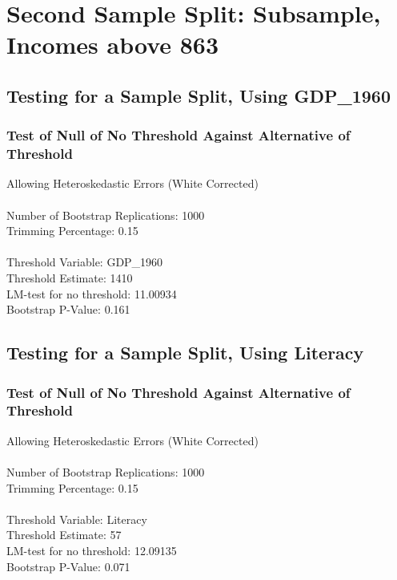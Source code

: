 \section{Second Sample Split: Subsample, Incomes above 863}

\subsection{Testing for a Sample Split, Using GDP\_1960} 
\subsubsection*{Test of Null of No Threshold Against Alternative of Threshold} 
Allowing Heteroskedastic Errors (White Corrected) \\\\
Number of Bootstrap Replications:  1000 \\
Trimming Percentage:               0.15 \\\\
Threshold Variable:                 GDP\_1960 \\
Threshold Estimate:                1410 \\
LM-test for no threshold:          11.00934 \\
Bootstrap P-Value:                 0.161 \\

\subsection{Testing for a Sample Split, Using Literacy} 
\subsubsection*{Test of Null of No Threshold Against Alternative of Threshold} 
Allowing Heteroskedastic Errors (White Corrected) \\\\
Number of Bootstrap Replications:  1000 \\
Trimming Percentage:               0.15 \\\\
Threshold Variable:                 Literacy \\
Threshold Estimate:                57 \\
LM-test for no threshold:          12.09135 \\
Bootstrap P-Value:                 0.071 \\

